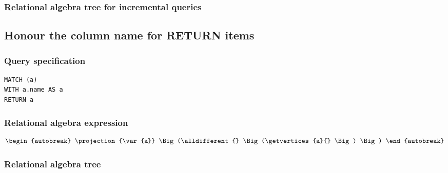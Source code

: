 \subsubsection*{Relational algebra tree for incremental queries}


\subsection{Honour the column name for RETURN items}

\subsubsection*{Query specification}

\begin{lstlisting}
MATCH (a)
WITH a.name AS a
RETURN a
\end{lstlisting}

\subsubsection*{Relational algebra expression}

\begin{align*}
\begin{autobreak}
\projection{\var{a}} \Big(\alldifferent{} \Big(\getvertices{a}{}
\Big)
\Big)
\end{autobreak}
\end{align*}

\subsubsection*{Relational algebra tree}

